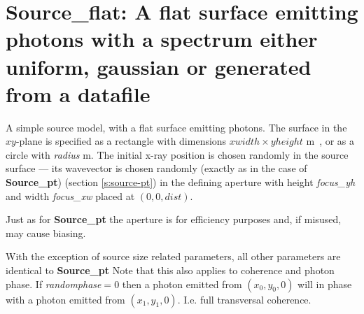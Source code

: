 \section{Source\_flat: A flat surface emitting photons with a spectrum either uniform, gaussian or generated from a datafile}
\label{source-flat}

A simple source model, with a flat surface emitting photons. The surface in the
$xy$-plane is specified as a rectangle with dimensions
$\mathit{xwidth}\times \mathit{yheight}$ \si{m \squared}, or as a circle with \textit{radius} \si{m}. 
The initial x-ray position is chosen randomly in the source surface --- its
wavevector is chosen randomly (exactly as in the case of \textbf{Source\_pt})
(section \ref{s:source-pt}) in the defining aperture with height \textit{focus\_yh} and
width \textit{focus\_xw} placed at $(0,0,\mathit{dist})$. 

Just as for \textbf{Source\_pt} the aperture is for efficiency purposes and, if misused, may cause biasing.

With the exception of source size related parameters, all other parameters are
identical to \textbf{Source\_pt} Note that this also applies to coherence and
photon phase. If \textit{randomphase}$=0$ then a photon emitted from
$(x_0,y_0,0)$ will in phase with a photon emitted from $(x_1,y_1,0)$. I.e. full
transversal coherence.
